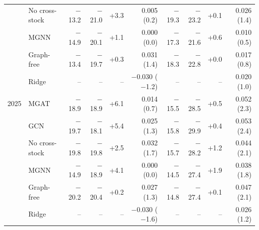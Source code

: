 \begin{table}[!t]
{\begin{tabular}{llrrrrrrrr}
 & No cross-stock & $-$13.2 & $-$21.0 & +3.3 & 0.005 (0.2) & $-$19.3 & $-$23.2 & +0.1 & 0.026 (1.4) \\
 & MGNN & $-$14.9 & $-$20.1 & +1.1 & 0.000 (0.0) & $-$17.3 & $-$21.6 & +0.6 & 0.010 (0.5) \\
 & Graph-free & $-$13.4 & $-$19.7 & +0.3 & 0.031 (1.4) & $-$18.3 & $-$22.8 & +0.0 & 0.017 (0.8) \\
 & Ridge & -- & -- & -- & $-$0.030 ($-$1.2) & -- & -- & -- & 0.020 (1.0) \\
\midrule
2025 & MGAT & $-$18.9 & $-$18.9 & +6.1 & 0.014 (0.7) & $-$15.5 & $-$28.5 & +0.5 & 0.052 (2.3) \\
 & GCN & $-$19.7 & $-$18.1 & +5.4 & 0.025 (1.3) & $-$15.8 & $-$29.9 & +0.4 & 0.053 (2.4) \\
 & No cross-stock & $-$19.8 & $-$19.8 & +2.5 & 0.032 (1.7) & $-$15.7 & $-$28.2 & +1.2 & 0.044 (2.1) \\
 & MGNN & $-$14.9 & $-$18.9 & +4.1 & 0.000 (0.0) & $-$14.5 & $-$27.4 & +1.9 & 0.038 (1.8) \\
 & Graph-free & $-$20.2 & $-$20.4 & +0.2 & 0.027 (1.3) & $-$14.8 & $-$27.4 & +0.1 & 0.047 (2.1) \\
 & Ridge & -- & -- & -- & $-$0.030 ($-$1.6) & -- & -- & -- & 0.026 (1.2) \\
\bottomrule\end{tabular}}
\end{table}
